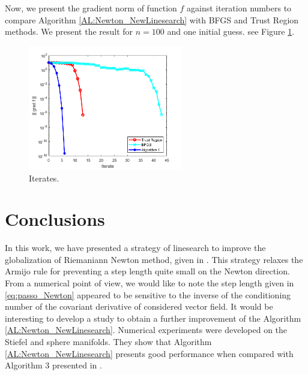 Now, we present the gradient norm of function $f$ against iteration numbers to compare Algorithm \ref{AL:Newton_NewLinesearch} with BFGS and Trust Region methods. We present the result for $n=100$ and one initial guess. see Figure \ref{fig:logdetiter}.

\begin{figure}
	\centering
	\includegraphics[width=0.6\textwidth]{logdet_iter.png}
	\caption{Iterates.}
	\label{fig:logdetiter}
\end{figure}


\section{ Conclusions} \label{sec:conclusions}
In this work, we have presented a strategy of linesearch to improve the globalization of Riemaniann Newton method, given in \cite{bortoloti2022efficient}.
This strategy relaxes the Armijo rule for preventing a step length quite small on the Newton direction.
From a numerical point of view, we would like to note the step length given in \eqref{eq:passo_Newton} appeared to be sensitive to the inverse of the conditioning number of the covariant derivative of considered vector field. It would be interesting to develop a study to obtain a further improvement of the Algorithm \ref{AL:Newton_NewLinesearch}.
Numerical experiments were developed on the Stiefel and sphere manifolds. They show that Algorithm \ref{AL:Newton_NewLinesearch} presents good performance when compared with Algorithm 3 presented in \cite{bortoloti2022efficient}.


